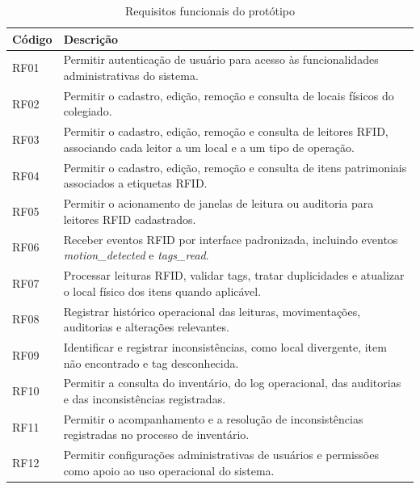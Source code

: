 \begin{table}[H]
\centering
\footnotesize
\setlength{\tabcolsep}{4pt}
\renewcommand{\arraystretch}{1.12}
\caption{Requisitos funcionais do protótipo}
\label{tab:requisitos-funcionais}
\begin{tabularx}{\textwidth}{>{\raggedright\arraybackslash}p{1.5cm}>{\raggedright\arraybackslash}X}
\toprule
\textbf{Código} & \textbf{Descrição} \\
\midrule
RF01 & Permitir autenticação de usuário para acesso às funcionalidades administrativas do sistema. \\
RF02 & Permitir o cadastro, edição, remoção e consulta de locais físicos do colegiado. \\
RF03 & Permitir o cadastro, edição, remoção e consulta de leitores RFID, associando cada leitor a um local e a um tipo de operação. \\
RF04 & Permitir o cadastro, edição, remoção e consulta de itens patrimoniais associados a etiquetas RFID. \\
RF05 & Permitir o acionamento de janelas de leitura ou auditoria para leitores RFID cadastrados. \\
RF06 & Receber eventos RFID por interface padronizada, incluindo eventos \textit{motion\_detected} e \textit{tags\_read}. \\
RF07 & Processar leituras RFID, validar tags, tratar duplicidades e atualizar o local físico dos itens quando aplicável. \\
RF08 & Registrar histórico operacional das leituras, movimentações, auditorias e alterações relevantes. \\
RF09 & Identificar e registrar inconsistências, como local divergente, item não encontrado e tag desconhecida. \\
RF10 & Permitir a consulta do inventário, do log operacional, das auditorias e das inconsistências registradas. \\
RF11 & Permitir o acompanhamento e a resolução de inconsistências registradas no processo de inventário. \\
RF12 & Permitir configurações administrativas de usuários e permissões como apoio ao uso operacional do sistema. \\
\bottomrule
\end{tabularx}
\end{table}

